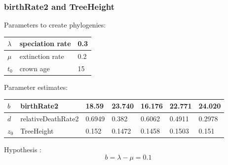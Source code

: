 \documentclass{beamer}
\begin{document}
\begin{frame}
  \frametitle{birthRate2 and TreeHeight}

  Parameters to create phylogenies:

  \begin{table}
    \centering
    \begin{tabular}{ | l | l | l | }
      \hline
      $\lambda$ & speciation rate & 0.3 \\
      \hline
      $\mu$ & extinction rate & 0.2 \\
      \hline
      $t_0$ & crown age & 15 \\
      \hline
    \end{tabular}
  \end{table}

  Parameter estimates:

  \begin{table}
    \begin{tabular}{ | l | l | l | l | l | l | l | }
      \hline
      $b$ & birthRate2         & 18.59  & 23.740 & 16.176 & 22.771 & 24.020 \\
      \hline
      $d$ & relativeDeathRate2 & 0.6949 & 0.382  & 0.6062 & 0.4911 & 0.2978 \\
      \hline
      $z_0$ & TreeHeight         & 0.152  & 0.1472 & 0.1458 & 0.1503 & 0.151  \\
      \hline
    \end{tabular}
  \end{table}

  Hypothesis \faFrownO:
  \begin{displaymath} 
    b = \lambda - \mu = 0.1
  \end{displaymath}

\end{frame}
\end{document}
